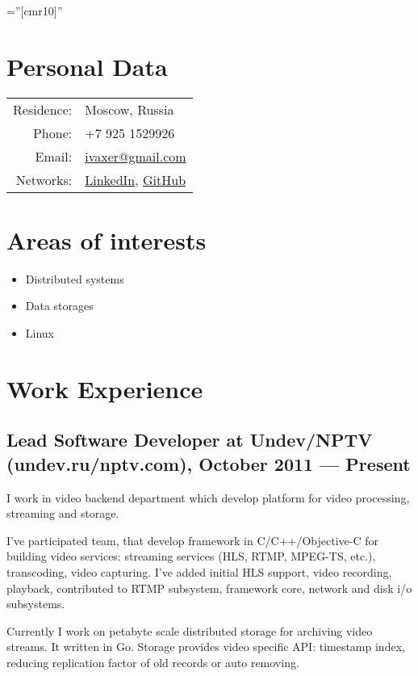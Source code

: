 \documentclass[a4paper,10pt]{article}
\begin{document}
\pagestyle{empty}

\font\fb=''[cmr10]''

\par{\bigskip\par}


\section{Personal Data}

\begin{tabular}{rl}
    Residence:   & Moscow, Russia\\
    Phone:     & +7 925 1529926\\
    Email:     & \href{mailto:ivaxer@gmail.com}{ivaxer@gmail.com} \\
    Networks: & \href{http://www.linkedin.com/in/ivaxer}{LinkedIn}, \href{https://github.com/ivaxer}{GitHub}
\end{tabular}


\section{Areas of interests}
\begin{itemize}
\item Distributed systems
\item Data storages
\item Linux
\end{itemize}


\section{Work Experience}
\subsection{Lead Software Developer at Undev/NPTV (undev.ru/nptv.com), October 2011 --- Present}
I work in video backend department which develop platform for video processing, streaming and storage.

I've participated team, that develop framework in C/C++/Objective-C for building video services: streaming services (HLS, RTMP, MPEG-TS, etc.), transcoding, video capturing. I've added initial HLS support, video recording, playback, contributed to RTMP subsystem, framework core, network and disk i/o subsystems.

Currently I work on petabyte scale distributed storage for archiving video streams. It written in Go. Storage provides video specific API: timestamp index, reducing replication factor of old records or auto removing.
\end{document}
